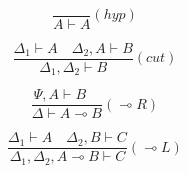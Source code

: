 \documentclass{article}
\begin{document}
\[
\frac{}{ A \vdash A} (hyp)
\]

\[
\frac{\Delta_1 \vdash A \quad \Delta_2, A \vdash B }{\Delta_1, \Delta_2 \vdash  B} (cut)
\]


\[
\frac{\Psi, A \vdash B \quad }{\Delta \vdash A \multimap B} (\multimap R)
\]


\[
\frac{\Delta_1 \vdash A \quad \Delta_2, B \vdash C}{\Delta_1,\Delta_2,A \multimap B \vdash C} (\multimap L)
\]
\end{document}
